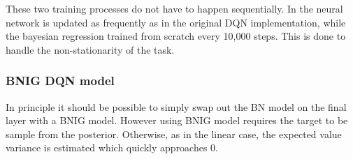 These two training processes do not have to happen sequentially. In \cite{azziz_2018} the neural network is updated as frequently as in the original DQN implementation, while the bayesian regression trained from scratch every 10,000 steps. This is done to handle the non-stationarity of the task.

\subsubsection{BNIG DQN model}

In principle it should be possible to simply swap out the BN model on the final layer with a BNIG model. However using BNIG model requires the target to be sample from the posterior. Otherwise, as in the linear case, the expected value variance is estimated which quickly approaches 0.



\cleardoublepage